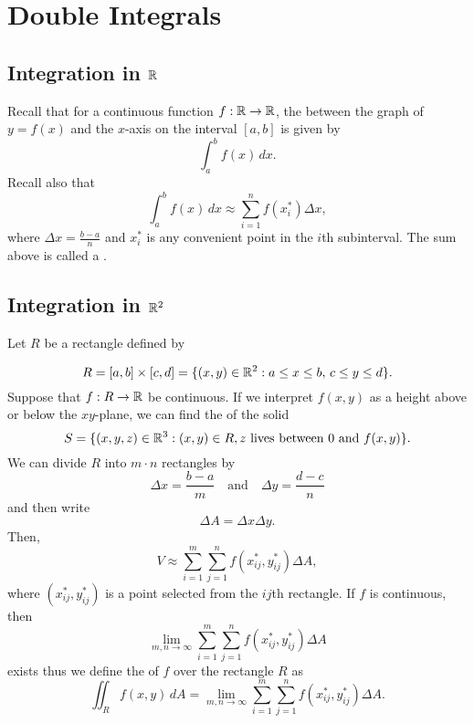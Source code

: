 \section{Double Integrals}

\subsection{Integration in \(\mathbb{R}\)}

Recall that for a continuous function \(f : \mathbb{R} \to \mathbb{R}\), the  between the graph of \(y = f(x)\) and the
\(x\)-axis on the interval \([a, b]\) is given by 
\[
\int_a^b f(x) \, dx.
\]
Recall also that
\[
\int_a^b f(x) \, dx \approx \sum_{i=1}^n f(x^*_i) \Delta x,
\]
where \(\Delta x = \frac{b-a}{n}\) and \(x^*_i\) is any convenient point in the \(i\)th subinterval. The sum above is called a .

\subsection{Integration in \(\mathbb{R}^2\)}

Let \(R\) be a rectangle defined by

\[
R = [a, b] \times [c, d] = \{(x, y) \in \mathbb{R}^2 : a \leq x \leq b, \, c \leq y \leq d\}.
\]
Suppose that \(f : R \to \mathbb{R}\) be continuous. If we interpret \(f(x, y)\) as a height above or below the \(xy\)-plane, we can find the  of the solid
\[
S = \{(x, y, z) \in \mathbb{R}^3 : (x, y) \in R, z \text{ lives between } 0 \text{ and } f(x, y)\}.
\]
We can divide \(R\) into \(m \cdot n\) rectangles by
\[
\Delta x = \frac{b-a}{m} \quad \text{and} \quad \Delta y = \frac{d-c}{n}
\]
and then write 
\[
\Delta A = \Delta x \Delta y.
\]
Then,
\[
V \approx \sum_{i=1}^m \sum_{j=1}^n f(x^*_{ij}, y^*_{ij}) \Delta A,
\]
where \((x^*_{ij}, y^*_{ij})\) is a point selected from the \(ij\)th rectangle.
\newpage
If \(f\) is continuous, then
\[
\lim_{m,n \to \infty} \sum_{i=1}^m \sum_{j=1}^n f(x^*_{ij}, y^*_{ij}) \Delta A
\]
exists thus we define the  of \(f\) over the rectangle \(R\) as
\[
\iint_R f(x, y) \, dA = \lim_{m,n \to \infty} \sum_{i=1}^m \sum_{j=1}^n f(x^*_{ij}, y^*_{ij}) \Delta A.
\]
